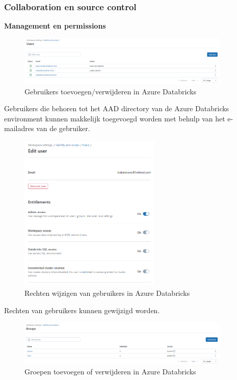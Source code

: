 \subsubsection{Collaboration en source control}

\textbf{Management en permissions}

\begin{figure}[H]
    \centering
    \includegraphics[width=0.9\textwidth]{./graphics/databricks/management_permissions_1.png}
    \caption{Gebruikers toevoegen/verwijderen in Azure Databricks}
\end{figure}

Gebruikers die behoren tot het AAD directory van de Azure Databricks environment kunnen makkelijk toegevoegd worden met behulp van het e-mailadres van de gebruiker.

\begin{figure}[H]
    \centering
    \includegraphics[width=0.6\textwidth]{./graphics/databricks/management_permissions_2.png}
    \caption{Rechten wijzigen van gebruikers in Azure Databricks}
\end{figure}

Rechten van gebruikers kunnen gewijzigd worden.

\begin{figure}[H]
    \centering
    \includegraphics[width=0.9\textwidth]{./graphics/databricks/management_permissions_3.png}
    \caption{Groepen toevoegen of verwijderen in Azure Databricks}
\end{figure}

